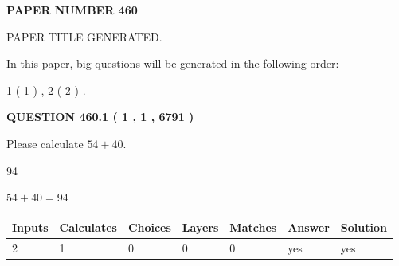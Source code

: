 \documentclass[12pt]{article}
\begin{document}
   
 {\textbf{ \Large{ PAPER NUMBER  460  }}}
   
   
\vspace{0.2in}
   
   
   
   
   
   
   
   
 \vspace{0.2in}
 
 
 
 
   
   
 PAPER TITLE GENERATED.
   
   
   
\vspace{0.2in}
   
In this paper, big questions will be generated in the following order: 
   
   
   1 ( 1 )
 ,
   2 ( 2 )
 .
  
\vspace{0.2in}
  
{\textbf{\Large{QUESTION
460.1 
 ( 1 , 1 , 6791 )
}}}
  
  
 
Please calculate $ %
54 +  %
40 $.
 
 
 
\noindent{}
 
 

94
 
 
\noindent{}
 
 

 
 
 
\noindent{}
 
 

$ %
54 +  %
40=   %
94$
 
 
\noindent{}
 
 

 
   
   
   
   
\noindent\begin{tabular}{|l|l|l|l|l|l|l|}
 \hline
Inputs & Calculates & Choices & Layers & Matches & Answer & Solution \\ \hline
 2  & 
 1  & 
 0
  & 
 0  & 
 0  & 
  yes & 
  yes 
  \\ \hline
 \end{tabular}
   
\end{document}
